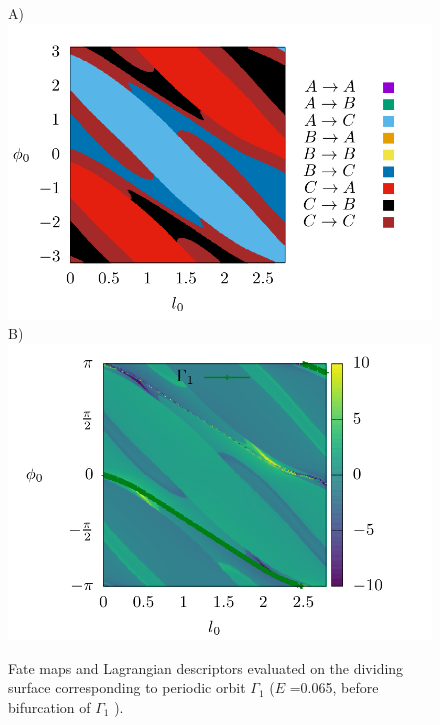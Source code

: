 \documentclass[10pt,aps,onecolumn,superscriptaddress]{revtex4-2}
\begin{document}
\begin{figure}[htbp]
	A)\includegraphics[scale=0.35]{fate_map_ds_gamma1E_0065.png}
	B)\includegraphics[scale=0.35]{ld_action_ds_gamma1_E_0065.png}
	\caption{ Fate maps and Lagrangian descriptors evaluated on the dividing surface corresponding to periodic orbit $\Gamma_1$ ($E$ =0.065, before bifurcation of $\Gamma_1$ ). }
	\label{fig:ld_fm_ds}
\end{figure}
\end{document}
